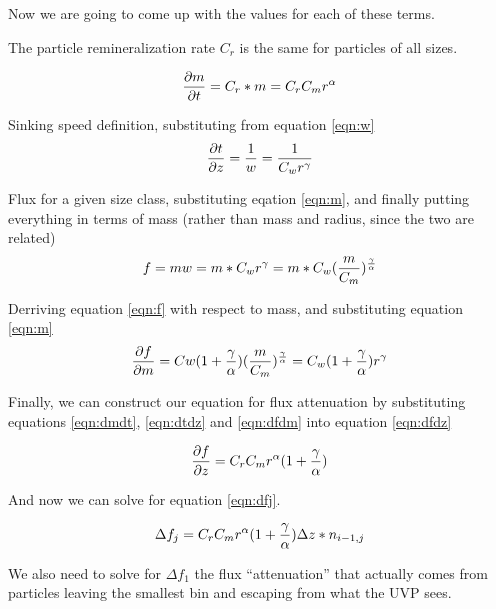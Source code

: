 \documentclass[a4paper,12pt]{article}
\begin{document}
\medskip

Now we are going to come up with the values for each of these terms.

\medskip

The particle remineralization rate $C_r$ is the same for particles of all sizes.

\begin{equation}
{{\partial m} \over {\partial t}} = C_r * m = C_r  C_m r^\alpha
\label{eqn:dmdt}
\end{equation}

Sinking speed definition, substituting from equation \ref{eqn:w}
\begin{equation}
{{\partial t} \over {\partial z}} = {1 \over w} = {1 \over C_w r^\gamma}
\label{eqn:dtdz}
\end{equation}

Flux for a given size class, substituting eqation \ref{eqn:m}, and finally putting everything in terms of mass (rather than mass and radius, since the two are related)
\begin{equation}
f = m w = m * C_w r^\gamma = m * C_w ({m\over C_m})^{\gamma \over \alpha}
\label{eqn:f}
\end{equation}

Derriving equation \ref{eqn:f} with respect to mass, and substituting equation \ref{eqn:m}
\begin{equation}
{{\partial f} \over {\partial m}} = 
Cw(1+{\gamma \over \alpha}) ({m \over C_m}) ^ {\gamma \over \alpha}=
C_w(1+{\gamma \over \alpha}) r ^ \gamma
\label{eqn:dfdm}
\end{equation}

Finally, we can construct our equation for flux attenuation by substituting equations \ref{eqn:dmdt}, \ref{eqn:dtdz} and \ref{eqn:dfdm} into equation \ref{eqn:dfdz}

\begin{equation}
{{\partial f} \over {\partial z}} = C_r C_m r^\alpha(1+{\gamma \over \alpha})
\end{equation}


And now we can solve for equation \ref{eqn:dfj}.

\begin{equation}
\Delta f_j = C_r C_m r^\alpha (1+{\gamma \over \alpha}) \Delta z * n_{i-1,j}
\label{eqn:dfj}
\end{equation}

We also need to solve for $\Delta f_1$ the flux ``attenuation'' that actually comes from particles leaving the smallest bin and escaping from what the UVP sees.
\end{document}
